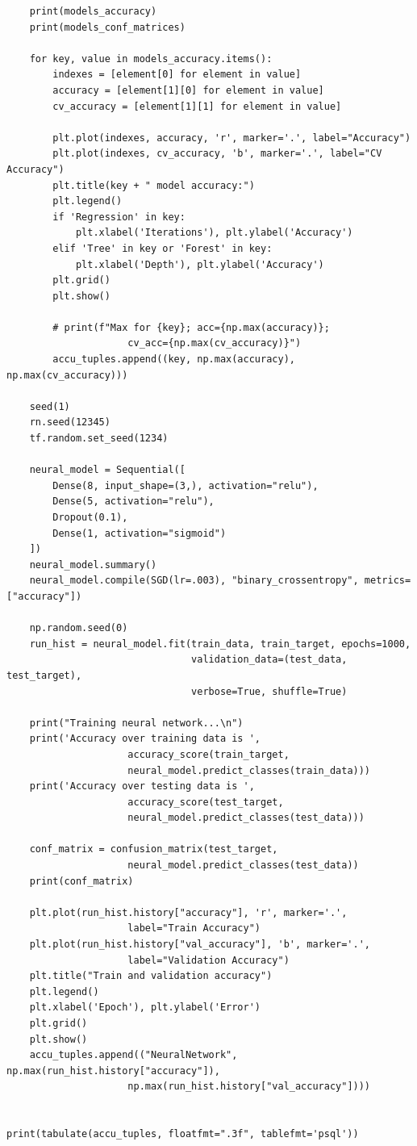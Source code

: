 \documentclass[11pt, a4paper, notitlepage]{report}
\begin{document}
\begin{appendices}
\begin{verbatim}
    print(models_accuracy)
    print(models_conf_matrices)

    for key, value in models_accuracy.items():
        indexes = [element[0] for element in value]
        accuracy = [element[1][0] for element in value]
        cv_accuracy = [element[1][1] for element in value]

        plt.plot(indexes, accuracy, 'r', marker='.', label="Accuracy")
        plt.plot(indexes, cv_accuracy, 'b', marker='.', label="CV Accuracy")
        plt.title(key + " model accuracy:")
        plt.legend()
        if 'Regression' in key:
            plt.xlabel('Iterations'), plt.ylabel('Accuracy')
        elif 'Tree' in key or 'Forest' in key:
            plt.xlabel('Depth'), plt.ylabel('Accuracy')
        plt.grid()
        plt.show()

        # print(f"Max for {key}; acc={np.max(accuracy)}; 
                     cv_acc={np.max(cv_accuracy)}")
        accu_tuples.append((key, np.max(accuracy), np.max(cv_accuracy)))

    seed(1)
    rn.seed(12345)
    tf.random.set_seed(1234)

    neural_model = Sequential([
        Dense(8, input_shape=(3,), activation="relu"),
        Dense(5, activation="relu"),
        Dropout(0.1),
        Dense(1, activation="sigmoid")
    ])
    neural_model.summary()
    neural_model.compile(SGD(lr=.003), "binary_crossentropy", metrics=["accuracy"])

    np.random.seed(0)
    run_hist = neural_model.fit(train_data, train_target, epochs=1000,
                                validation_data=(test_data, test_target),
                                verbose=True, shuffle=True)

    print("Training neural network...\n")
    print('Accuracy over training data is ', 
                     accuracy_score(train_target, 
                     neural_model.predict_classes(train_data)))
    print('Accuracy over testing data is ', 
                     accuracy_score(test_target, 
                     neural_model.predict_classes(test_data)))

    conf_matrix = confusion_matrix(test_target, 
                     neural_model.predict_classes(test_data))
    print(conf_matrix)

    plt.plot(run_hist.history["accuracy"], 'r', marker='.', 
                     label="Train Accuracy")
    plt.plot(run_hist.history["val_accuracy"], 'b', marker='.', 
                     label="Validation Accuracy")
    plt.title("Train and validation accuracy")
    plt.legend()
    plt.xlabel('Epoch'), plt.ylabel('Error')
    plt.grid()
    plt.show()
    accu_tuples.append(("NeuralNetwork", np.max(run_hist.history["accuracy"]), 
                     np.max(run_hist.history["val_accuracy"])))


print(tabulate(accu_tuples, floatfmt=".3f", tablefmt='psql'))
\end{verbatim}
\end{appendices}
\end{document}
